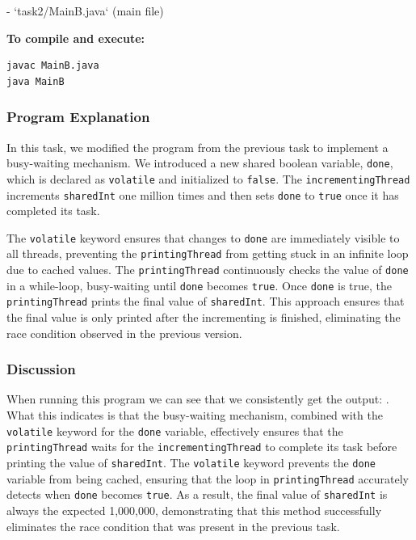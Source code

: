 \documentclass{article}
\begin{document}
- `task2/MainB.java` (main file)

\textbf{To compile and execute:}
\begin{lstlisting}[style=bash]
javac MainB.java
java MainB
\end{lstlisting}

\subsubsection{Program Explanation}
In this task, we modified the program from the previous task to implement a busy-waiting mechanism. We introduced a new shared boolean variable, \texttt{done}, which is declared as \texttt{volatile} and initialized to \texttt{false}. The \texttt{incrementingThread} increments \texttt{sharedInt} one million times and then sets \texttt{done} to \texttt{true} once it has completed its task.

The \texttt{volatile} keyword ensures that changes to \texttt{done} are immediately visible to all threads, preventing the \texttt{printingThread} from getting stuck in an infinite loop due to cached values. The \texttt{printingThread} continuously checks the value of \texttt{done} in a while-loop, busy-waiting until \texttt{done} becomes \texttt{true}. Once \texttt{done} is true, the \texttt{printingThread} prints the final value of \texttt{sharedInt}. This approach ensures that the final value is only printed after the incrementing is finished, eliminating the race condition observed in the previous version.

\subsubsection{Discussion}
When running this program we can see that we consistently get the output: . What this indicates is that the busy-waiting mechanism, combined with the \texttt{volatile} keyword for the \texttt{done} variable, effectively ensures that the \texttt{printingThread} waits for the \texttt{incrementingThread} to complete its task before printing the value of \texttt{sharedInt}. The \texttt{volatile} keyword prevents the \texttt{done} variable from being cached, ensuring that the loop in \texttt{printingThread} accurately detects when \texttt{done} becomes \texttt{true}. As a result, the final value of \texttt{sharedInt} is always the expected 1,000,000, demonstrating that this method successfully eliminates the race condition that was present in the previous task.
\end{document}
